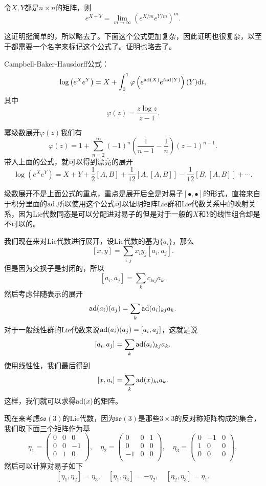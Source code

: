 \pro
令$X,Y$都是$n\times n$的矩阵，则
\[
	e^{X+Y}=\lim_{m\to\infty}\left(e^{X/m}e^{Y/m}\right)^m.
\]

这证明挺简单的，所以略去了。下面这个公式更加复杂，因此证明也很复杂，以至于都需要一个名字来标记这个公式了。证明也略去了。
\begin{theo}
Campbell-Baker-Hausdorff公式：
\[
\log\left(e^Xe^Y\right)=X+\int_0^1 \varphi\left(e^{{\mathrm{ad}}(X)}e^{t{\mathrm{ad}}(Y)}\right)(Y)\mathrm{d} t,
\]
其中
\[
\varphi(z)=\frac{z\log z}{z-1}.
\]
\end{theo}
幂级数展开$\varphi(z)$我们有
\[
	\varphi(z)=1+\sum_{n=2}^\infty (-1)^n\left(\frac{1}{n-1}-\frac{1}{n}\right)(z-1)^{n-1}.
\]
带入上面的公式，就可以得到漂亮的展开
\[
\log\left(e^Xe^Y\right)=X+Y+\frac{1}{2}[A,B]+\frac{1}{12}[A,[A,B]]-\frac{1}{12}[B,[A,B]]+\cdots.
\]

级数展开不是上面公式的重点，重点是展开后全是对易子$[\bullet,\bullet]$的形式，直接来自于积分里面的${\mathrm{ad}}$.所以使用这个公式可以证明矩阵Lie群和Lie代数关系中的映射关系，因为Lie代数同态是可以分配进对易子的但是对于一般的$X$和$Y$的线性组合却是不可以的。

我们现在来对Lie代数进行展开，设Lie代数的基为$\{a_i\}$，那么
\[
[x,y]=\sum_{i,j}x_iy_j[a_i,a_j].
\]
但是因为交换子是封闭的，所以
\[
	[a_i,a_j]=\sum_k c_{kij}a_k.
\]
然后考虑伴随表示的展开
\[
	{\mathrm{ad}}(a_i)(a_j)=\sum_k {\mathrm{ad}}(a_i)_{kj}a_k.
\]
对于一般线性群的Lie代数来说${\mathrm{ad}}(a_i)(a_j)=[a_i,a_j]$，这就是说
\[
	[a_i,a_j]=\sum_k {\mathrm{ad}}(a_i)_{kj}a_k.
\]
使用线性性，我们最后得到
\[
	[x,a_i]=\sum_k {\mathrm{ad}}(x)_{ki}a_k.
\]
这样，我们就可以求得${\mathrm{ad}}(x)$的矩阵。

现在来考虑$\mathfrak{so}(3)$的Lie代数，因为$\mathfrak{so}(3)$是那些$3\times 3$的反对称矩阵构成的集合，我们取下面三个矩阵作为基
\[
	\eta_1=
		\begin{pmatrix}
			0&0&0\\
			0&0&-1\\
			0&1&0\\
		\end{pmatrix},\quad
	\eta_2=
		\begin{pmatrix}
			0&0&1\\
			0&0&0\\
			-1&0&0\\
		\end{pmatrix},\quad
	\eta_3=
		\begin{pmatrix}
			0&-1&0\\
			1&0&0\\
			0&0&0\\
		\end{pmatrix},
\]
然后可以计算对易子如下
\[
	[\eta_1,\eta_2]=\eta_3,\quad [\eta_1,\eta_3]=-\eta_2,\quad [\eta_2,\eta_3]=\eta_1.
\]

